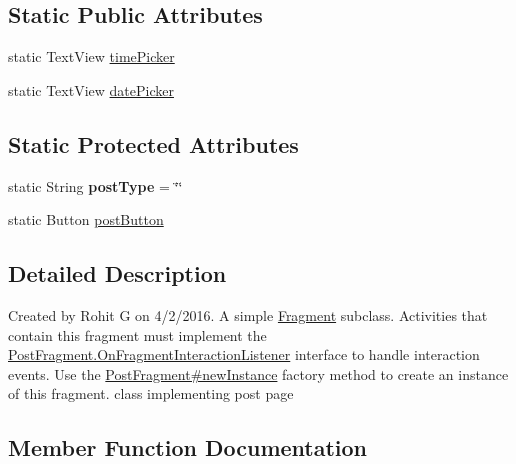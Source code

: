 \subsection*{Static Public Attributes}
\begin{DoxyCompactItemize}
\item 
static Text\+View \hyperlink{classcom_1_1example_1_1sel_1_1lostfound_1_1PostFragment_ac6d98a5b689bea76cf1248a20a54d23c}{time\+Picker}
\item 
static Text\+View \hyperlink{classcom_1_1example_1_1sel_1_1lostfound_1_1PostFragment_a1c187b07da5262cf568439018a826ef9}{date\+Picker}
\end{DoxyCompactItemize}
\subsection*{Static Protected Attributes}
\begin{DoxyCompactItemize}
\item 
static String {\bfseries post\+Type} = \char`\"{}\char`\"{}\hypertarget{classcom_1_1example_1_1sel_1_1lostfound_1_1PostFragment_acb0672afa2382233136ee251bef7149b}{}\label{classcom_1_1example_1_1sel_1_1lostfound_1_1PostFragment_acb0672afa2382233136ee251bef7149b}

\item 
static Button \hyperlink{classcom_1_1example_1_1sel_1_1lostfound_1_1PostFragment_ab2d93225b515c22ccd209e1382e1a4a1}{post\+Button}
\end{DoxyCompactItemize}


\subsection{Detailed Description}
Created by Rohit G on 4/2/2016. A simple \hyperlink{}{Fragment} subclass. Activities that contain this fragment must implement the \hyperlink{interfacecom_1_1example_1_1sel_1_1lostfound_1_1PostFragment_1_1OnFragmentInteractionListener}{Post\+Fragment.\+On\+Fragment\+Interaction\+Listener} interface to handle interaction events. Use the \hyperlink{classcom_1_1example_1_1sel_1_1lostfound_1_1PostFragment_a7350f5b81aa9144d9acdeca902676773}{Post\+Fragment\#new\+Instance} factory method to create an instance of this fragment. class implementing post page 

\subsection{Member Function Documentation}
